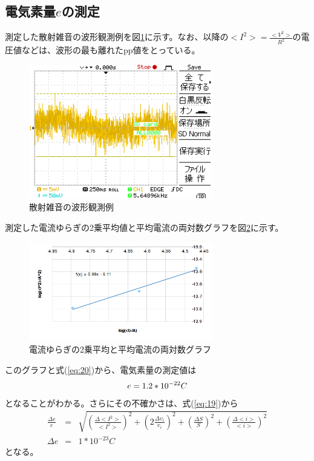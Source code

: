 \documentclass[11pt,a4j]{jsarticle}
\begin{document}
   \subsection{電気素量$e$の測定}
   
   測定した散射雑音の波形観測例を図\ref{fig:wave2}に示す。なお、以降の$<I^2> = \frac{<V^2>}{R^2}$の電圧値などは、波形の最も離れたpp値をとっている。
   
   \begin{figure}[htbp]
  \centering
  \includegraphics[width=8cm,clip]{A0000DS.png}
  \caption{散射雑音の波形観測例}
  \label{fig:wave2}
 \end{figure}%
   
   測定した電流ゆらぎの2乗平均値と平均電流の両対数グラフを図\ref{fig:3}に示す。
   \begin{figure}[htbp]
  \centering
  \includegraphics[width=8cm,clip]{3.png}
  \caption{電流ゆらぎの2乗平均と平均電流の両対数グラフ}
  \label{fig:3}
 \end{figure}%
   
   このグラフと式(\ref{eq:20})から、電気素量の測定値は
   \begin{equation}
   e = 1.2 * 10^{-22} C \nonumber \\
   \end{equation}
   となることがわかる。さらにその不確かさは、式(\ref{eq:19})から
   \begin{eqnarray}
   \frac{\Delta e}{e} &=& \sqrt{(\frac{\Delta <I^2>}{<I^2>})^2 + (2\frac{\Delta v_i}{v_i})^2 + (\frac{\Delta S}{S})^2 + (\frac{\Delta <i>}{<i>})^2} \nonumber \\
   \Delta e &=& 1 * 10^{-23} C \nonumber
   \end{eqnarray}
   となる。
   
\end{document}
